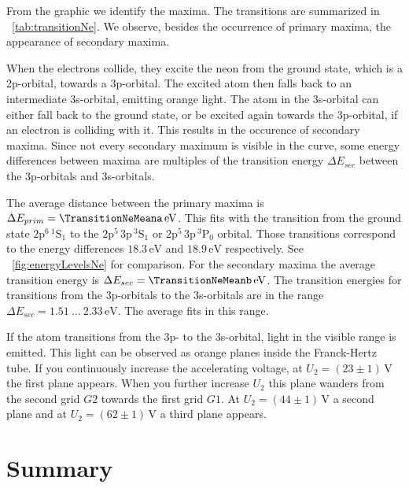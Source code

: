 \documentclass[a4paper,10pt,twocolumn]{article}
\newcommand{\volt}{\, \mathrm{V}}
\newcommand{\eV}{\, \mathrm{eV}}
\newcommand{\neLevelA}{2\mathrm{p}^{5} \, 3\mathrm{p} \, ^{3}\mathrm{P}_0}
\newcommand{\neLevelAA}{2\mathrm{p}^{5} \, 3\mathrm{p} \, ^{3}\mathrm{S}_1}
\newcommand{\neLevelGround}{2\mathrm{p}^{6} \, ^{1}\mathrm{S}_1}
\newcommand{\TheoreticalTransitionNea}{18.9}
\newcommand{\TheoreticalTransitionNeaa}{18.3}
\newcommand{\TheoreticalTransitionNeb}{1.51 \ \dots \ 2.33}
\begin{document}
    From the graphic we identify the maxima.
    The transitions are summarized in ~\autoref{tab:transitionNe}.
    We observe, besides the occurrence of primary maxima, the appearance of secondary maxima.
    
    When the electrons collide, they excite the neon from the ground state, which is a 2p-orbital, towards a 3p-orbital.
    The excited atom then falls back to an intermediate 3s-orbital, emitting orange light.
    The atom in the 3s-orbital can either fall back to the ground state, or be excited again towards the
    3p-orbital, if an electron is colliding with it.
    This results in the occurence of secondary maxima.
    Since not every secondary maximum is visible in the curve, some energy differences
    between maxima are multiples of the transition energy $\Delta E_{sec}$
    between the 3p-orbitals and 3s-orbitals.
    
    The average distance between the primary maxima is $\Delta E_{prim} = \TransitionNeMeana \eV$.
    This fits with the transition from the ground state $\neLevelGround$ to the $\neLevelAA$ or $\neLevelA$ orbital.
    Those transitions correspond to the energy differences $\TheoreticalTransitionNeaa \eV$ and $\TheoreticalTransitionNea \eV$
    respectively.
    See ~\autoref{fig:energyLevelsNe} for comparison.
    For the secondary maxima the average transition energy is $\Delta E_{sec} = \TransitionNeMeanb \eV$.
    The transition energies for transitions from the 3p-orbitals to the 3s-orbitals are in the range
    $\Delta E_{sec} = \TheoreticalTransitionNeb \eV$.
    The average fits in this range.
    
    If the atom transitions from the 3p- to the 3s-orbital, light in the visible range is emitted.
    This light can be observed as orange planes inside the Franck-Hertz tube.
    If you continuously increase the accelerating voltage, at $U_2 = (23 \pm 1) \volt$ the first plane appears.
    When you further increase $U_2$ this plane wanders from the second grid $G2$ towards the first grid $G1$.
    At $U_2 = (44 \pm 1)\volt$ a second plane and at $U_2 = (62 \pm 1)\volt$ a third plane appears.
    
    \section{Summary}
    
\end{document}
